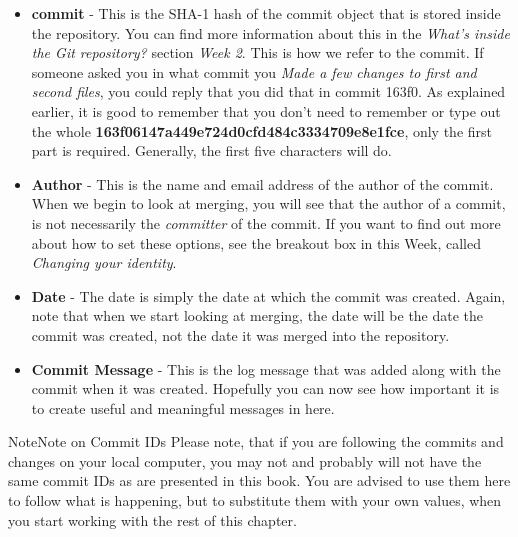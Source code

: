 \begin{itemize}
\item \textbf{commit} - This is the SHA-1 hash of the commit object that is stored inside the repository.
You can find more information about this in the \emph{What's inside the Git repository?} section \emph{Week 2}.
This is how we refer to the commit.
If someone asked you in what commit you \emph{Made a few changes to first and second files}, you could reply that you did that in commit 163f0.
As explained earlier, it is good to remember that you don't need to remember or type out the whole \textbf{163f06147a449e724d0cfd484c3334709e8e1fce}, only the first part is required.
Generally, the first five characters will do.
\item \textbf{Author} - This is the name and email address of the author of the commit.
When we begin to look at merging, you will see that the author of a commit, is not necessarily the \emph{committer} of the commit.
If you want to find out more about how to set these options, see the breakout box in this Week, called \emph{Changing your identity}.
\item \textbf{Date} - The date is simply the date at which the commit was created.
Again, note that when we start looking at merging, the date will be the date the commit was created, not the date it was merged into the repository.
\item \textbf{Commit Message} - This is the log message that was added along with the commit when it was created.
Hopefully you can now see how important it is to create useful and meaningful messages in here.
\end{itemize}

\begin{callout}{Note}{Note on Commit IDs}
Please note, that if you are following the commits and changes on your local computer, you may not and probably will not have the same commit IDs as are presented in this book.
You are advised to use them here to follow what is happening, but to substitute them with your own values, when you start working with the rest of this chapter.
\end{callout}

